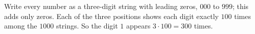 Write every number as a three-digit string with leading zeros, $000$ to $999$; this adds only zeros. Each of the three positions shows each digit exactly $100$ times among the $1000$ strings. So the digit $1$ appears $3\cdot100=\boxed{300}$ times.
